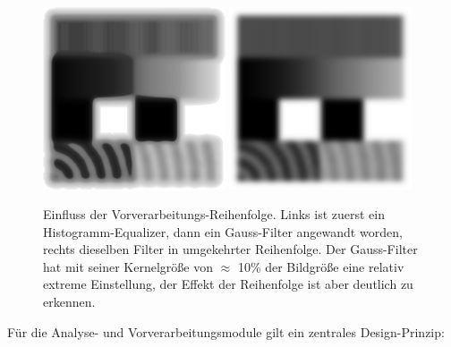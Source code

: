 \documentclass[
  12pt,
  openany]{book}
\begin{document}
\begin{figure}

{\centering \includegraphics[width=0.48\textwidth]{../imgs/gauss_hist} \includegraphics[width=0.48\textwidth]{../imgs/hist_gauss} 

}

\caption[Einfluss der Vorverarbeitungs-Reihenfolge.]{Einfluss der Vorverarbeitungs-Reihenfolge. Links ist zuerst ein Histogramm-Equalizer, dann ein Gauss-Filter angewandt worden, rechts dieselben Filter in umgekehrter Reihenfolge. Der Gauss-Filter hat mit seiner Kernelgröße von \(\approx\) 10\% der Bildgröße eine relativ extreme Einstellung, der Effekt der Reihenfolge ist aber deutlich zu erkennen.}\label{fig:prepOrder}
\end{figure}

Für die Analyse- und Vorverarbeitungsmodule gilt ein zentrales Design-Prinzip:
\end{document}

